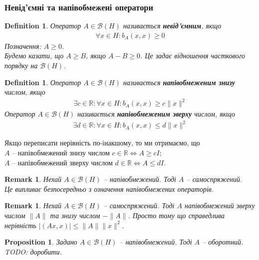 \documentclass[a4paper, 10pt]{article}
\theoremstyle{theoremdd}
\theoremstyle{theoremdd}
\newtheorem{definition}[theorem]{Definition}
\theoremstyle{theoremdd}
\theoremstyle{theoremdd}
\theoremstyle{theoremdd}
\newtheorem{proposition}[theorem]{Proposition}
\theoremstyle{theoremdd}
\newtheorem{remark}[theorem]{Remark}
\theoremstyle{theoremdd}
\theoremstyle{theoremdd}
\begin{document}
\subsubsection{Невід'ємні та напівобмежені оператори}
\begin{definition}
Оператор $A \in \mathcal{B}(H)$ називається \textbf{невід'ємним}, якщо
\begin{align*}
\forall x \in H: b_A(x,x) \geq 0
\end{align*}
Позначення: $A \geq 0$.\\
Будемо казати, що $A \geq B$, якщо $A-B \geq 0$. Це задає відношення часткового порядку на $\mathcal{B}(H)$.
\end{definition}

\begin{definition}
Оператор $A \in \mathcal{B}(H)$ називається \textbf{напівобмеженим знизу} числом, якщо
\begin{align*}
\exists c \in \mathbb{R}: \forall x \in H: b_A(x,x) \geq c \|x\|^2
\end{align*}
Оператор $A \in \mathcal{B}(H)$ називається \textbf{напівобмеженим зверху} числом, якщо
\begin{align*}
\exists d \in \mathbb{R}: \forall x \in H: b_A(x,x) \leq d \|x\|^2
\end{align*}
\end{definition}
\noindent
Якщо переписати нерівність по-інакшому, то ми отримаємо, що\\
$A$ -- напівобмежений знизу числом $c \in \mathbb{R} \iff A \geq c I$;\\
$A$ -- напівобмежений зверху числом $d \in \mathbb{R} \iff A \leq d I$.

\begin{remark}
Нехай $A \in \mathcal{B}(H)$ -- напівобмежений. Тоді $A$ -- самоспряжений.\\
Це випливає безпосередньо з означення напівобмежених операторів.
\end{remark}

\begin{remark}
Нехай $A \in \mathcal{B}(H)$ -- самоспряжений. Тоді $A$ напівобмежений зверху числом $\|A\|$ та знизу числом $-\|A\|$. Просто тому що справедлива нерівність $|(Ax,x)| \leq \|A\| \|x\|^2$.
\end{remark}

\begin{proposition}
Задано $A \in \mathcal{B}(H)$ -- напівобмежений. Тоді $A$ -- оборотний.\\
\textit{TODO: доробити.}
\end{proposition}
\end{document}
